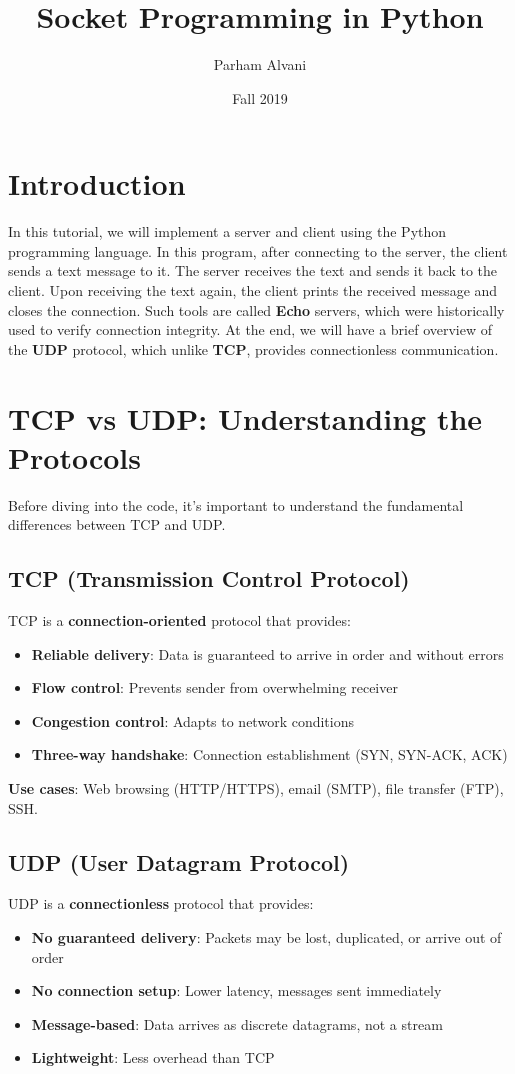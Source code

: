 \documentclass[]{article}
\title{Socket Programming in Python}
\author{Parham Alvani}
\date{Fall 2019}
\begin{document}
  \maketitle
  \tableofcontents
  \newpage

  \section{Introduction}
  In this tutorial, we will implement a server and client using the Python programming language.
  In this program, after connecting to the server, the client sends a text message to it.
  The server receives the text and sends it back to the client. Upon receiving the text again, the client prints the received message and closes the connection.
  Such tools are called \textbf{Echo} servers, which were historically used to verify connection integrity.
  At the end, we will have a brief overview of the \textbf{UDP} protocol, which unlike \textbf{TCP}, provides connectionless communication.

  \section{TCP vs UDP: Understanding the Protocols}
  Before diving into the code, it's important to understand the fundamental differences between TCP and UDP.

  \subsection{TCP (Transmission Control Protocol)}
  TCP is a \textbf{connection-oriented} protocol that provides:
  \begin{itemize}
    \item \textbf{Reliable delivery}: Data is guaranteed to arrive in order and without errors
    \item \textbf{Flow control}: Prevents sender from overwhelming receiver
    \item \textbf{Congestion control}: Adapts to network conditions
    \item \textbf{Three-way handshake}: Connection establishment (SYN, SYN-ACK, ACK)
  \end{itemize}

  \textbf{Use cases}: Web browsing (HTTP/HTTPS), email (SMTP), file transfer (FTP), SSH.

  \subsection{UDP (User Datagram Protocol)}
  UDP is a \textbf{connectionless} protocol that provides:
  \begin{itemize}
    \item \textbf{No guaranteed delivery}: Packets may be lost, duplicated, or arrive out of order
    \item \textbf{No connection setup}: Lower latency, messages sent immediately
    \item \textbf{Message-based}: Data arrives as discrete datagrams, not a stream
    \item \textbf{Lightweight}: Less overhead than TCP
  \end{itemize}
\end{document}
